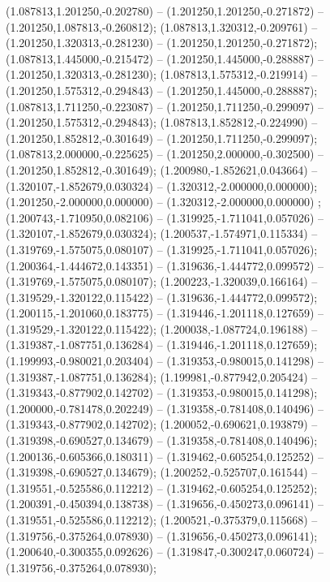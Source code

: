  (1.087813,1.201250,-0.202780) -- (1.201250,1.201250,-0.271872) -- (1.201250,1.087813,-0.260812);
 (1.087813,1.320312,-0.209761) -- (1.201250,1.320313,-0.281230) -- (1.201250,1.201250,-0.271872);
 (1.087813,1.445000,-0.215472) -- (1.201250,1.445000,-0.288887) -- (1.201250,1.320313,-0.281230);
 (1.087813,1.575312,-0.219914) -- (1.201250,1.575312,-0.294843) -- (1.201250,1.445000,-0.288887);
 (1.087813,1.711250,-0.223087) -- (1.201250,1.711250,-0.299097) -- (1.201250,1.575312,-0.294843);
 (1.087813,1.852812,-0.224990) -- (1.201250,1.852812,-0.301649) -- (1.201250,1.711250,-0.299097);
 (1.087813,2.000000,-0.225625) -- (1.201250,2.000000,-0.302500) -- (1.201250,1.852812,-0.301649);
 (1.200980,-1.852621,0.043664) -- (1.320107,-1.852679,0.030324) -- (1.320312,-2.000000,0.000000);
 (1.201250,-2.000000,0.000000) -- (1.320312,-2.000000,0.000000) ;
 (1.200743,-1.710950,0.082106) -- (1.319925,-1.711041,0.057026) -- (1.320107,-1.852679,0.030324);
 (1.200537,-1.574971,0.115334) -- (1.319769,-1.575075,0.080107) -- (1.319925,-1.711041,0.057026);
 (1.200364,-1.444672,0.143351) -- (1.319636,-1.444772,0.099572) -- (1.319769,-1.575075,0.080107);
 (1.200223,-1.320039,0.166164) -- (1.319529,-1.320122,0.115422) -- (1.319636,-1.444772,0.099572);
 (1.200115,-1.201060,0.183775) -- (1.319446,-1.201118,0.127659) -- (1.319529,-1.320122,0.115422);
 (1.200038,-1.087724,0.196188) -- (1.319387,-1.087751,0.136284) -- (1.319446,-1.201118,0.127659);
 (1.199993,-0.980021,0.203404) -- (1.319353,-0.980015,0.141298) -- (1.319387,-1.087751,0.136284);
 (1.199981,-0.877942,0.205424) -- (1.319343,-0.877902,0.142702) -- (1.319353,-0.980015,0.141298);
 (1.200000,-0.781478,0.202249) -- (1.319358,-0.781408,0.140496) -- (1.319343,-0.877902,0.142702);
 (1.200052,-0.690621,0.193879) -- (1.319398,-0.690527,0.134679) -- (1.319358,-0.781408,0.140496);
 (1.200136,-0.605366,0.180311) -- (1.319462,-0.605254,0.125252) -- (1.319398,-0.690527,0.134679);
 (1.200252,-0.525707,0.161544) -- (1.319551,-0.525586,0.112212) -- (1.319462,-0.605254,0.125252);
 (1.200391,-0.450394,0.138738) -- (1.319656,-0.450273,0.096141) -- (1.319551,-0.525586,0.112212);
 (1.200521,-0.375379,0.115668) -- (1.319756,-0.375264,0.078930) -- (1.319656,-0.450273,0.096141);
 (1.200640,-0.300355,0.092626) -- (1.319847,-0.300247,0.060724) -- (1.319756,-0.375264,0.078930);
